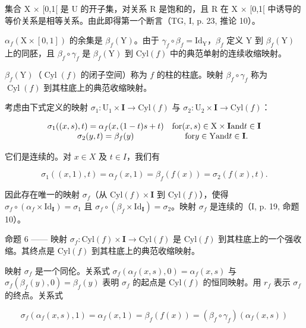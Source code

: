 集合 X × {[}0,1{[} 是 U 的开子集，对关系 R 是饱和的，且 R 在 X × {[}0,1{[} 中诱导的等价关系是相等关系。由此即得第一个断言（TG, I, p. 23, 推论 10）。

\(\alpha_{f}(\mathrm{X}\times[0,1])\) 的余集是 \(\beta_{f}(\mathrm{Y})\)。由于 \(\gamma_{f}\circ\beta_{f}=\mathrm{Id}_{\mathrm{Y}}\)，\(\beta_{f}\) 定义 Y 到 \(\beta_{f}(\mathrm{Y})\) 上的同胚，且 \(\beta_{f}\circ\gamma_{f}\) 是 \(\beta_{f}(\mathrm{Y})\) 到 \(\mathrm{Cyl}(f)\) 中的典范单射的连续收缩映射。

\(\beta_{f}(\mathrm{Y})\)（\(\operatorname{Cyl}(f)\) 的闭子空间）称为 \(f\) 的柱的柱底。映射 \(\beta_{f} \circ \gamma_{f}\) 称为 \(\operatorname{Cyl}(f)\) 到其柱底上的典范收缩映射。

考虑由下式定义的映射 \(\sigma_{1}\colon\mathrm{U}_{1}\times\mathbf{I}\to\mathrm{Cyl}(f)\) 与 \(\sigma_{2}\colon\mathrm{U}_{2}\times\mathbf{I}\to\mathrm{Cyl}(f)\)：

\[
\begin{array}{c c} \sigma_ {1} ((x, s), t) = \alpha_ {f} (x, (1 - t) s + t) & \text {for} (x, s) \in \mathrm{X} \times \mathbf {I} \text {and} t \in \mathbf {I} \\ \sigma_ {2} (y, t) = \beta_ {f} (y) & \text {for} y \in \mathrm{Y} \text {and} t \in \mathbf {I}. \end{array}
\]

它们是连续的。对 \(x \in X\) 及 \(t \in I\)，我们有

\[
\sigma_ {1} ((x, 1), t) = \alpha_ {f} (x, 1) = \beta_ {f} (f (x)) = \sigma_ {2} (f (x), t).
\]

因此存在唯一的映射 \(\sigma_{f}\)（从 \(\mathrm{Cyl}(f)\times\mathbf{I}\) 到 \(\mathrm{Cyl}(f)\)），使得 \(\sigma_{f}\circ(\alpha_{f}\times\mathrm{Id}_{\mathbf{I}})=\sigma_{1}\) 且 \(\sigma_{f}\circ(\beta_{f}\times\mathrm{Id}_{\mathbf{I}})=\sigma_{2}\)。映射 \(\sigma_{f}\) 是连续的（I, p. 19, 命题 10）。

命题 6 —— 映射 \(\sigma_{f}\colon\mathrm{Cyl}(f)\times\mathbf{I}\to\mathrm{Cyl}(f)\) 是 \(\mathrm{Cyl}(f)\) 到其柱底上的一个强收缩。其终点是 \(\mathrm{Cyl}(f)\) 到其柱底上的典范收缩映射。

映射 \(\sigma_f\) 是一个同伦。关系式 \(\sigma_f(\alpha_f(x,s),0) = \alpha_f(x,s)\) 与 \(\sigma_f(\beta_f(y),0) = \beta_f(y)\) 表明 \(\sigma_f\) 的起点是 \(\mathrm{Cyl}(f)\) 的恒同映射。用 \(r_f\) 表示 \(\sigma_f\) 的终点。关系式

\[
\sigma_ {f} \left(\alpha_ {f} (x, s), 1\right) = \alpha_ {f} (x, 1) = \beta_ {f} (f (x)) = \left(\beta_ {f} \circ \gamma_ {f}\right) \left(\alpha_ {f} (x, s)\right)
\]

